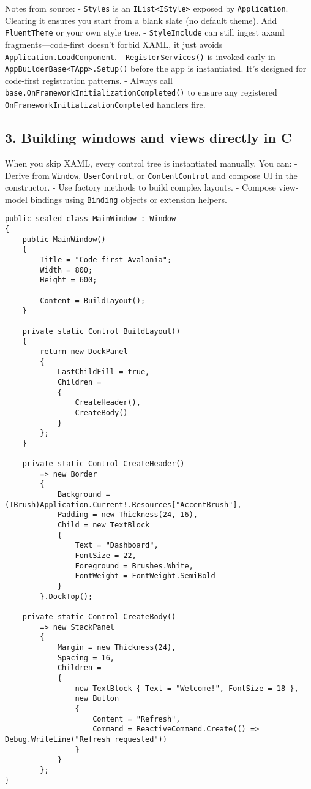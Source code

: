 Notes from source: - \passthrough{\lstinline!Styles!} is an
\passthrough{\lstinline!IList<IStyle>!} exposed by
\passthrough{\lstinline!Application!}. Clearing it ensures you start
from a blank slate (no default theme). Add
\passthrough{\lstinline!FluentTheme!} or your own style tree. -
\passthrough{\lstinline!StyleInclude!} can still ingest axaml
fragments---code-first doesn't forbid XAML, it just avoids
\passthrough{\lstinline!Application.LoadComponent!}. -
\passthrough{\lstinline!RegisterServices()!} is invoked early in
\passthrough{\lstinline!AppBuilderBase<TApp>.Setup()!} before the app is
instantiated. It's designed for code-first registration patterns. -
Always call
\passthrough{\lstinline!base.OnFrameworkInitializationCompleted()!} to
ensure any registered
\passthrough{\lstinline!OnFrameworkInitializationCompleted!} handlers
fire.

\subsection{3. Building windows and views directly in
C}\label{building-windows-and-views-directly-in-c}

When you skip XAML, every control tree is instantiated manually. You
can: - Derive from \passthrough{\lstinline!Window!},
\passthrough{\lstinline!UserControl!}, or
\passthrough{\lstinline!ContentControl!} and compose UI in the
constructor. - Use factory methods to build complex layouts. - Compose
view-model bindings using \passthrough{\lstinline!Binding!} objects or
extension helpers.

\begin{lstlisting}
public sealed class MainWindow : Window
{
    public MainWindow()
    {
        Title = "Code-first Avalonia";
        Width = 800;
        Height = 600;

        Content = BuildLayout();
    }

    private static Control BuildLayout()
    {
        return new DockPanel
        {
            LastChildFill = true,
            Children =
            {
                CreateHeader(),
                CreateBody()
            }
        };
    }

    private static Control CreateHeader()
        => new Border
        {
            Background = (IBrush)Application.Current!.Resources["AccentBrush"],
            Padding = new Thickness(24, 16),
            Child = new TextBlock
            {
                Text = "Dashboard",
                FontSize = 22,
                Foreground = Brushes.White,
                FontWeight = FontWeight.SemiBold
            }
        }.DockTop();

    private static Control CreateBody()
        => new StackPanel
        {
            Margin = new Thickness(24),
            Spacing = 16,
            Children =
            {
                new TextBlock { Text = "Welcome!", FontSize = 18 },
                new Button
                {
                    Content = "Refresh",
                    Command = ReactiveCommand.Create(() => Debug.WriteLine("Refresh requested"))
                }
            }
        };
}
\end{lstlisting}

